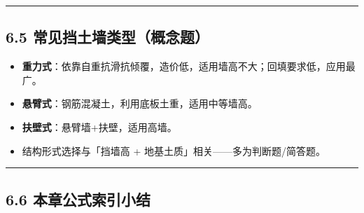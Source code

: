 \documentclass[
]{article}
\providecommand{\tightlist}{%
  \setlength{\itemsep}{0pt}\setlength{\parskip}{0pt}}
\begin{document}
\begin{center}\rule{0.5\linewidth}{0.5pt}\end{center}

\subsection{6.5
常见挡土墙类型（概念题）}\label{ux5e38ux89c1ux6321ux571fux5899ux7c7bux578bux6982ux5ff5ux9898}

\begin{itemize}
\tightlist
\item
  \textbf{重力式}：依靠自重抗滑抗倾覆，造价低，适用墙高不大；回填要求低，应用最广。
\item
  \textbf{悬臂式}：钢筋混凝土，利用底板土重，适用中等墙高。
\item
  \textbf{扶壁式}：悬臂墙+扶壁，适用高墙。
\item
  结构形式选择与「挡墙高 + 地基土质」相关------多为判断题/简答题。
\end{itemize}

\begin{center}\rule{0.5\linewidth}{0.5pt}\end{center}

\subsection{6.6
本章公式索引小结}\label{ux672cux7ae0ux516cux5f0fux7d22ux5f15ux5c0fux7ed3}
\end{document}
